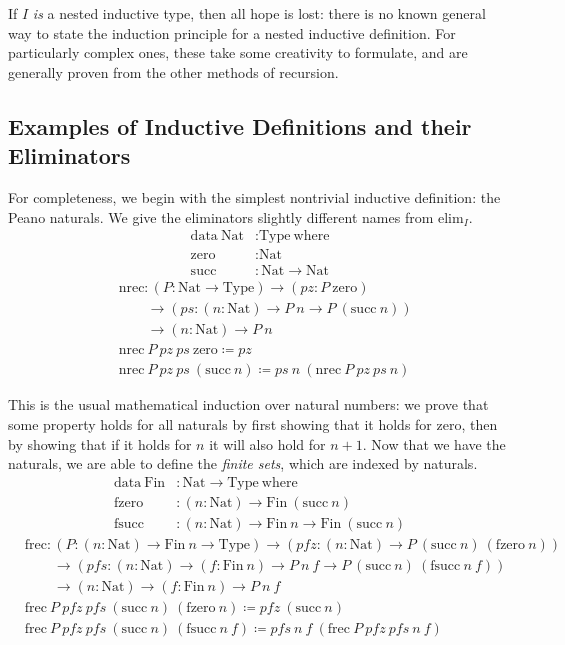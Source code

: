 \documentclass{report}
\newcommand{\Nat}{\const{Nat}}
\newcommand{\zero}{\const{zero}}
\renewcommand{\succ}{\const{succ}}
\newcommand{\Fin}{\const{Fin}}
\newcommand{\fzero}{\const{fzero}}
\newcommand{\fsucc}{\const{fsucc}}
\newcommand{\const}[1]{\text{#1}}
\newcommand{\data}{\const{data}}
\newcommand{\Type}{\const{Type}}
\newcommand{\where}{\const{where}}
\begin{document}
If $I$ \emph{is} a nested inductive type, then all hope is lost: there is no known general way to state the induction principle for a nested inductive definition. For particularly complex ones, these take some creativity to formulate, and are generally proven from the other methods of recursion.

\subsection{Examples of Inductive Definitions and their Eliminators}

For completeness, we begin with the simplest nontrivial inductive definition: the Peano naturals. We give the eliminators slightly different names from $\const{elim}_I$.
%
\begin{align*}
    \data ~ \Nat &: \Type ~ \where \\
    \zero &: \Nat \\
    \succ &: \Nat \to \Nat
\end{align*}
%
\begin{align*}
    &\const{nrec} : (P : \Nat \to \Type) \to (pz: P ~ \zero) \\
    &\qquad\to (ps: (n: \Nat) \to P ~ n \to P ~ (\succ ~ n)) \\
    &\qquad\to (n: \Nat) \to P ~ n \\
    &\const{nrec} ~ P ~ pz ~ ps ~ \zero \coloneqq pz \\
    &\const{nrec} ~ P ~ pz ~ ps ~ (\succ ~ n) \coloneqq ps ~ n ~ (\const{nrec} ~ P ~ pz ~ ps ~ n)
\end{align*}

This is the usual mathematical induction over natural numbers: we prove that some property holds for all naturals by first showing that it holds for zero, then by showing that if it holds for $n$ it will also hold for $n+1$. Now that we have the naturals, we are able to define the \emph{finite sets}, which are indexed by naturals.
%
\begin{align*}
    \data ~ \Fin &: \Nat \to \Type ~ \where \\
    \fzero &: (n: \Nat) \to \Fin ~ (\succ ~ n) \\
    \fsucc &: (n: \Nat) \to \Fin ~ n \to \Fin ~ (\succ ~ n)
\end{align*}
%
\begin{align*}
    &\const{frec} : (P : (n: \Nat) \to \Fin ~ n \to \Type) \to (pfz: (n: \Nat) \to P ~ (\succ ~ n) ~ (\fzero ~ n)) \\
    &\qquad\to (pfs: (n: \Nat) \to (f: \Fin ~ n) \to P ~ n ~ f \to P ~ (\succ ~ n) ~ (\fsucc ~ n ~ f)) \\
    &\qquad\to (n: \Nat) \to (f: \Fin ~ n) \to P ~ n ~ f \\
    &\const{frec} ~ P ~ pfz ~ pfs ~ (\succ ~ n) ~ (\fzero ~ n) \coloneqq pfz ~ (\succ ~ n) \\
    &\const{frec} ~ P ~ pfz ~ pfs ~ (\succ ~ n) ~ (\fsucc ~ n ~ f) \coloneqq pfs ~ n ~ f ~ (\const{frec} ~ P ~ pfz ~ pfs ~ n ~ f)
\end{align*}
\end{document}
